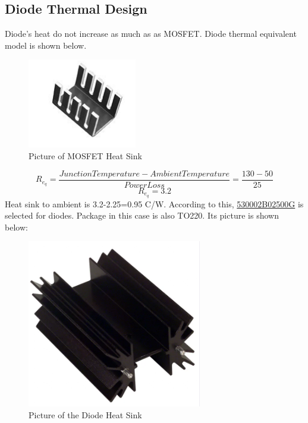 \documentclass{article}
\begin{document}
\subsection{Diode Thermal Design}
Diode's heat do not increase as much as as MOSFET. Diode thermal equivalent model is shown below.
\begin{figure}[H]
    \centering
    \includegraphics[scale=0.4]{mosfet_sink.PNG}
    \caption{Picture of MOSFET Heat Sink}
    \label{fig:my_label}
\end{figure}
\begin{equation}
    R_e_q=\frac{Junction Temperature-Ambient Temperature}{Power Loss}=\frac{130-50}{25}
\end{equation}
\begin{equation}
    R_e_q=3.2
\end{equation}
Heat sink to ambient is 3.2-2.25=0.95 C/W. According to this, \href{https://www.boydcorp.com/aavid-datasheets/Board-Level-Cooling-Extruded-5290.pdf}{530002B02500G} is selected for diodes. Package in this case is also TO220. Its picture is shown below:
\begin{figure}[H]
    \centering
    \includegraphics[scale=0.3]{diode_sink.PNG}
    \caption{Picture of the Diode Heat Sink}
    \label{fig:my_label}
\end{figure}
\end{document}
